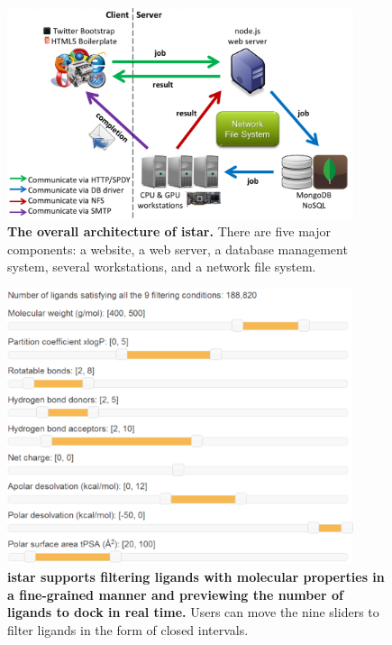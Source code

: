 \documentclass[10pt]{article}
\begin{document}
\begin{figure}[!ht]
\begin{center}
\includegraphics[width=4in]{Architecture.eps}
\end{center}
\caption{
{\bf The overall architecture of istar.} There are five major components: a website, a web server, a database management system, several workstations, and a network file system.
}
\label{Architecture}
\end{figure}

\begin{figure}[!ht]
\begin{center}
\includegraphics[width=4in]{Slider.eps}
\end{center}
\caption{
{\bf istar supports filtering ligands with molecular properties in a fine-grained manner and previewing the number of ligands to dock in real time.} Users can move the nine sliders to filter ligands in the form of closed intervals.
}
\label{Slider}
\end{figure}
\end{document}
